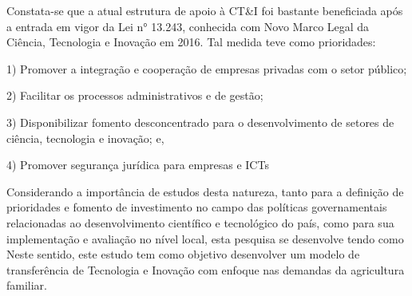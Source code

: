 Constata-se que a atual estrutura de apoio à CT\&I foi bastante beneficiada após a entrada em vigor da Lei n° 13.243, conhecida com Novo Marco Legal da Ciência, Tecnologia e Inovação em 2016. Tal medida teve como prioridades: 

1) Promover a integração e cooperação de empresas privadas com o setor público;

2) Facilitar os processos administrativos e de gestão;

3) Disponibilizar fomento desconcentrado para o desenvolvimento de setores de ciência, tecnologia e inovação; e,

4) Promover segurança jurídica para empresas e ICTs 


Considerando a importância de estudos desta natureza, tanto para a definição de prioridades e fomento de investimento no campo das políticas governamentais relacionadas ao desenvolvimento científico e tecnológico do país, como para sua implementação e avaliação no nível local, esta pesquisa se desenvolve tendo como Neste sentido, este estudo tem como objetivo desenvolver um modelo de transferência de Tecnologia e Inovação com enfoque nas demandas da agricultura familiar. 




